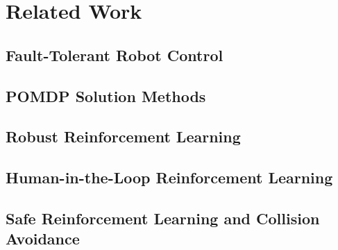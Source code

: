 
\chapter{Related Work}\label{ch:related_work}

\section{Fault-Tolerant Robot Control}\label{sec:ftc}


\section{POMDP Solution Methods}\label{sec:pomdp_methods}


\section{Robust Reinforcement Learning}\label{sec:robust_rl}


\section{Human-in-the-Loop Reinforcement Learning}\label{sec:hil_rl}


\section{Safe Reinforcement Learning and Collision Avoidance}\label{sec:safe_rl}

